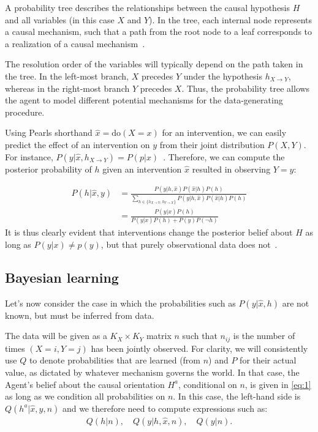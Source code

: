 \documentclass[letterpaper]{article} %
\newcommand{\doo}{\textrm{do}}
\newcommand{\prob}{ P }
\begin{document}
A probability tree describes the relationships between the causal hypothesis $H$ and all variables (in this case $X$ and $Y$). In the tree, each internal node represents a causal mechanism, such that a path from the root node to a leaf corresponds to a realization of a causal mechanism~\cite{ortega2015subjectivity}.

The resolution order of the variables will typically depend on the path taken in the tree. In the left-most branch, $X$ precedes $Y$ under the hypothesis $h_{X\rightarrow Y}$, whereas in the right-most branch $Y$ precedes $X$. Thus, the probability tree allows the agent to model different potential mechanisms for the data-generating procedure.

Using Pearls shorthand $\hat x = \doo(X=x)$ for an intervention, we can easily predict the effect of an intervention on $y$ from their joint distribution $P(X,Y)$. For instance, $P(y | \hat x, h_{X \rightarrow Y}) = P(p |x)$~\cite{genewein2020algorithms}. Therefore, we can compute the posterior probability of $h$ given an intervention $\hat x$ resulted in observing $Y=y$: %

\begin{align}
\prob(h|\hat{x},y)
&= \frac{\prob(y|h,\hat{x})\prob(\hat{x}|h)\prob(h)}
{ \sum_{h \in \{ h_{X \rightarrow Y}, h_{Y\rightarrow X}\} } \prob(y|h,\hat{x})\prob(\hat{x}|h)\prob(h) }\nonumber  \\
& = \frac{P(y | x)P(h) }{ P(y|x)P(h) + P(y  ) P(\neg h) } \label{eq:1}
\end{align}
It is thus clearly evident that interventions change the posterior belief about $H$ as long as $P(y | x) \neq p(y)$, but that purely observational data does not~\cite{ortega2015subjectivity}.






\subsection{Bayesian learning}
Let's now consider the case in which the probabilities such as $P(y | \hat x, h)$ are not known, but must be inferred from data.

The data will be given as a $K_X \times K_Y$ matrix $n$ such that $n_{ij}$ is the number of times $(X = i, Y=j)$ has been jointly observed. For clarity, we will consistently use $Q$ to denote probabilities that are learned (from $n$) and $P$ for their actual value, as dictated by whatever mechanism governs the world. In that case, the Agent's belief about the causal orientation $H^a$, conditional on $n$, is given in \cref{eq:1} as long as we condition all probabilities on $n$. In this case, the left-hand side is $Q(h^a | \hat x, y, n)$ and we therefore need to compute expressions such as:
\begin{align}
Q(h  | n), \quad Q(y  | h, \hat x, n), \quad Q(y  | n).
\end{align}
\end{document}
